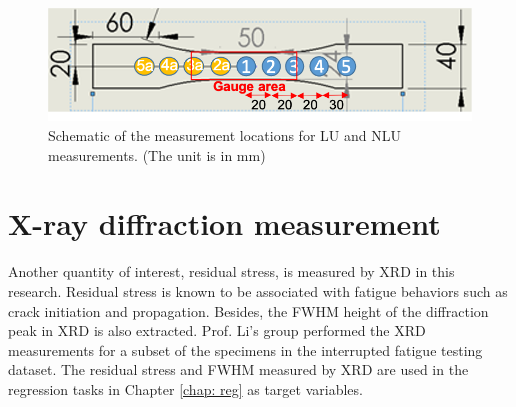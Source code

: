 \begin{figure}[tb]
  \centering
  \includegraphics[width=0.6\linewidth]{fig/specimen_measurment_locs.png}
  \caption{Schematic of the measurement locations for LU and NLU measurements. (The unit is in mm)}
  \label{fig: measurement locations}
\end{figure}

\section{X-ray diffraction measurement}
Another quantity of interest, residual stress, is measured by XRD in this research. Residual stress is known to be associated with fatigue behaviors such as crack initiation and propagation. Besides, the FWHM height of the diffraction peak in XRD is also extracted. Prof. Li's group performed the XRD measurements for a subset of the specimens in the interrupted fatigue testing dataset. The residual stress and FWHM measured by XRD are used in the regression tasks in Chapter \ref{chap: reg} as target variables.
